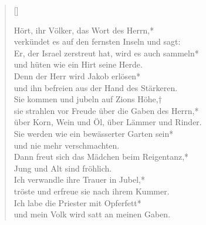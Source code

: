 \begin{verse}[\versewidth]


Hört, ihr Völker, das Wort des Herrn,*\\
verkündet es auf den fernsten Inseln und sagt:\\ 
\vin Er, der Israel zerstreut hat, wird es auch sammeln*\\
\vin und hüten wie ein Hirt seine Herde.\\
Denn der Herr wird Jakob erlösen*\\
und ihn befreien aus der Hand des Stärkeren.\\
\vin Sie kommen und jubeln auf Zions Höhe,†\\
\vin sie strahlen vor Freude über die Gaben des Herrn,*\\ 
\vin über Korn, Wein und Öl, über Lämmer und Rinder.\\ 
Sie werden wie ein bewässerter Garten sein*\\ 
und nie mehr verschmachten.\\
\vin Dann freut sich das Mädchen beim Reigentanz,*\\
\vin Jung und Alt sind fröhlich.\\ 
Ich verwandle ihre Trauer in Jubel,*\\
tröste und erfreue sie nach ihrem Kummer.\\
\vin Ich labe die Priester mit Opferfett*\\
\vin und mein Volk wird satt an meinen Gaben.\\

\end{verse}





